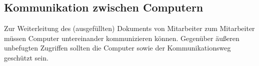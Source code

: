 \subsection{Kommunikation zwischen Computern}
Zur Weiterleitung des (ausgefüllten) Dokuments von Mitarbeiter zum Mitarbeiter müssen Computer untereinander kommunizieren können. Gegenüber äußeren unbefugten Zugriffen sollten die Computer sowie der Kommunikationsweg geschützt sein.